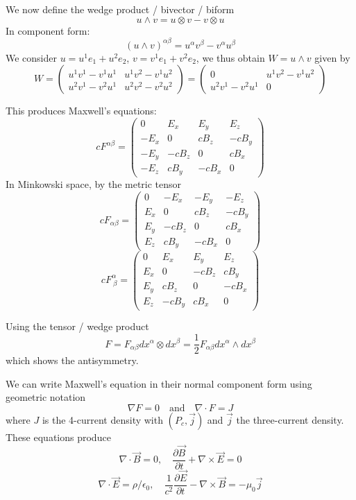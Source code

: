 \documentclass{article}
\begin{document}
    We now define the wedge product / bivector / biform
    $$ u \wedge v = u \otimes v - v \otimes u $$
    In component form:
    $$ (u \wedge v)^{\alpha \beta} = u^\alpha v^\beta - v^\alpha u^\beta $$
    We consider $u = u^1 e_1 + u^2 e_2$, $v = v^1 e_1 + v^2 e_2$, we thus obtain $W = u \wedge v$ given by
    $$ W = \begin{pmatrix} u^1 v^1 - v^1 u^1 & u^1 v^2 - v^1 u^2 \\ u^2 v^1 - v^2 u^1 & u^2 v^2 - v^2 u^2 \end{pmatrix} = \begin{pmatrix} 0 & u^1 v^2 - v^1 u^2 \\ u^2 v^1 - v^2 u^1 & 0 \end{pmatrix} $$
    
    This produces Maxwell's equations:
    $$ c F^{\alpha \beta} = \begin{pmatrix} 0 & E_x & E_y & E_z \\ -E_x & 0 & cB_z & -cB_y \\ -E_y & -cB_z & 0 & cB_x \\ -E_z & cB_y & -cB_x & 0 \end{pmatrix} $$
    In Minkowski space, by the metric tensor
    $$ c F_{\alpha \beta} = \begin{pmatrix} 0 & -E_x & -E_y & -E_z \\ E_x & 0 & cB_z & -cB_y \\ E_y & -cB_z & 0 & cB_x \\ E_z & cB_y & -cB_x & 0 \end{pmatrix} $$
    $$ c F^\alpha_{\ \beta} = \begin{pmatrix} 0 & E_x & E_y & E_z \\ E_x & 0 & -cB_z & cB_y \\ E_y & cB_z & 0 & -cB_x \\ E_z & -cB_y & cB_x & 0 \end{pmatrix} $$
    
    Using the tensor / wedge product
    $$ F = F_{\alpha \beta} dx^\alpha \otimes dx^\beta = \frac{1}{2} F_{\alpha \beta} dx^\alpha \wedge dx^\beta $$
    which shows the antisymmetry.
    
    We can write Maxwell's equation in their normal component form using geometric notation
    $$ \nabla F = 0 \quad \text{and} \quad \nabla \cdot F = J $$
    where $J$ is the 4-current density with $(P_c, \vec{j})$ and $\vec{j}$ the three-current density.
    These equations produce
    $$ \nabla \cdot \vec{B} = 0, \quad \frac{\partial \vec{B}}{\partial t} + \nabla \times \vec{E} = 0 $$
    $$ \nabla \cdot \vec{E} = \rho / \epsilon_0, \quad \frac{1}{c^2} \frac{\partial \vec{E}}{\partial t} - \nabla \times \vec{B} = -\mu_0 \vec{j} $$
    
\end{document}
